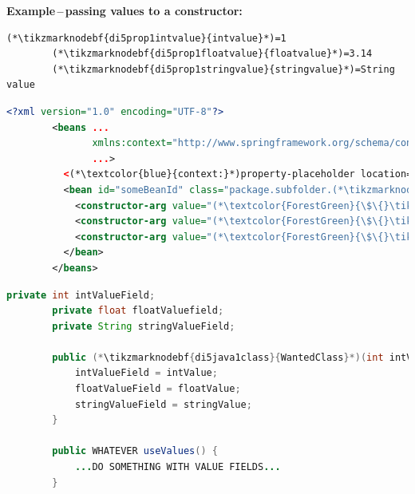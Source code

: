 \documentclass[12pt, dvipsnames, oneside, a4paper, titlepage, usenames]{report}
\begin{document}
    \vspace{\baselineskip}
    \noindent \textbf{Example\,--\,passing values to a constructor:}
    \begin{lstlisting}[title={A \textit{.properties} file called \tikzmarknodebf{di5prop1filename}{\textit{constructor.properties}}}]
        (*\tikzmarknodebf{di5prop1intvalue}{intvalue}*)=1
        (*\tikzmarknodebf{di5prop1floatvalue}{floatvalue}*)=3.14
        (*\tikzmarknodebf{di5prop1stringvalue}{stringvalue}*)=String value
    \end{lstlisting}
    \begin{lstlisting}[language=XML, title={Configuration XML}]
        <?xml version="1.0" encoding="UTF-8"?>
        <beans ...
               xmlns:context="http://www.springframework.org/schema/context"
               ...>
          <(*\textcolor{blue}{context:}*)property-placeholder location="classpath:(*\tikzmarknodebf{di5xml1filename}{constructor.properties}[ForestGreen]*)"/>
          <bean id="someBeanId" class="package.subfolder.(*\tikzmarknodebf{di5xml1class}{WantedClass}[ForestGreen]*)">
            <constructor-arg value="(*\textcolor{ForestGreen}{\$\{}\tikzmarknodebf{di5xml1intvalue}{intvalue}[ForestGreen]\textcolor{ForestGreen}{\}}*)"/>
            <constructor-arg value="(*\textcolor{ForestGreen}{\$\{}\tikzmarknodebf{di5xml1floatvalue}{floatvalue}[ForestGreen]\textcolor{ForestGreen}{\}}*)"/>
            <constructor-arg value="(*\textcolor{ForestGreen}{\$\{}\tikzmarknodebf{di5xml1stringvalue}{stringvalue}[ForestGreen]\textcolor{ForestGreen}{\}}*)"/>
          </bean>
        </beans>
    \end{lstlisting}
    \begin{lstlisting}[language=Java, title={Wanted class with the constructor}]
        private int intValueField;
        private float floatValuefield;
        private String stringValueField;

        public (*\tikzmarknodebf{di5java1class}{WantedClass}*)(int intValue, float floatValue, String stringValue) {
            intValueField = intValue;
            floatValueField = floatValue;
            stringValueField = stringValue;
        }

        public WHATEVER useValues() {
            ...DO SOMETHING WITH VALUE FIELDS...
        }
    \end{lstlisting}
    \newpage
\end{document}
